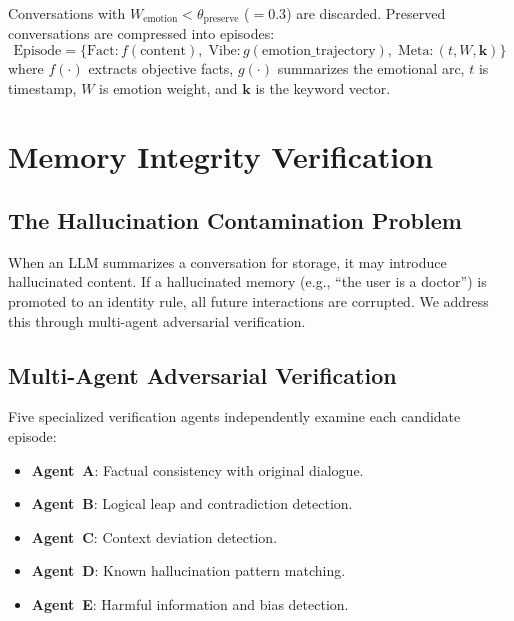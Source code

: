 \documentclass[11pt,a4paper]{article}
\begin{document}
Conversations with $W_{\text{emotion}} < \theta_{\text{preserve}}$ ($= 0.3$) are discarded.
Preserved conversations are compressed into episodes:
\begin{equation}
  \text{Episode} = \bigl\{
    \text{Fact}: f(\text{content}),\;
    \text{Vibe}: g(\text{emotion\_trajectory}),\;
    \text{Meta}: (t, W, \mathbf{k})
  \bigr\}
\end{equation}
where $f(\cdot)$ extracts objective facts, $g(\cdot)$ summarizes the emotional arc, $t$ is
timestamp, $W$ is emotion weight, and $\mathbf{k}$ is the keyword vector.

\section{Memory Integrity Verification}

\subsection{The Hallucination Contamination Problem}

When an LLM summarizes a conversation for storage, it may introduce hallucinated content.
If a hallucinated memory (e.g., ``the user is a doctor'') is promoted to an identity rule,
all future interactions are corrupted. We address this through multi-agent adversarial
verification.

\subsection{Multi-Agent Adversarial Verification}

Five specialized verification agents independently examine each candidate episode:

\begin{itemize}[itemsep=2pt]
  \item \textbf{Agent~A}: Factual consistency with original dialogue.
  \item \textbf{Agent~B}: Logical leap and contradiction detection.
  \item \textbf{Agent~C}: Context deviation detection.
  \item \textbf{Agent~D}: Known hallucination pattern matching.
  \item \textbf{Agent~E}: Harmful information and bias detection.
\end{itemize}
\end{document}
